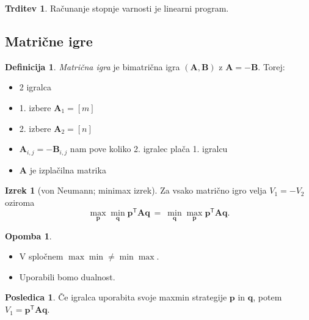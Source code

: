 \documentclass[11pt]{article}
\newcommand{\oklepaj}[1]{\left(#1\right)}
\newcommand{\T}{\textsf{T}}
\newcommand{\p}{\mathbf{p}}
\newcommand{\q}{\mathbf{q}}
\renewcommand{\AA}{\mathbf{A}}
\newcommand{\BB}{\mathbf{B}}
\newcommand{\1}{\mathbbm{1}}
\theoremstyle{definition}
\newtheorem{definicija}{Definicija}[section]
\theoremstyle{definition}
\newtheorem{trditev}{Trditev}[section]
\theoremstyle{definition}
\newtheorem{izrek}{Izrek}[section]
\theoremstyle{definition}
\newtheorem*{posledica}{Posledica}
\newtheorem*{opomba}{Opomba}
\begin{document}
\begin{trditev}

Računanje stopnje varnosti je linearni program.

\end{trditev}
\vspace{0.5cm}


\subsection{Matrične igre}
\vspace{0.5cm}

\begin{definicija}

\textit{Matrična igra} je bimatrična igra $\oklepaj{\AA,\BB}$ z $\AA=-\BB$. Torej:
\begin{itemize}
	\item 2 igralca
	\item 1. izbere $\AA_1 = [m]$
	\item 2. izbere $\AA_2 = [n]$
	\item $\AA_{i,j}=-\BB_{i,j}$ nam pove koliko 2. igralec plača 1. igralcu
	\item $\AA$ je izplačilna matrika
\end{itemize}

\end{definicija}
\vspace{0.5cm}

\begin{izrek}[von Neumann; minimax izrek]

Za vsako matrično igro velja $V_1 = -V_2$ oziroma
$$\max_\p \min_\q \p^\T\AA\q ~=~ \min_\q \max_\p \p^\T\AA\q.$$

\end{izrek}
\vspace{0.5cm}

\begin{opomba}
~
\begin{itemize}
	\item V spločnem $\max\min \neq \min\max$.
	\item Uporabili bomo dualnost.
\end{itemize}

\end{opomba}
\vspace{0.5cm}

\begin{posledica}

Če igralca uporabita svoje maxmin strategije $\p$ in $\q$, potem $V_1 = \p^\T\AA\q$.

\end{posledica}
\vspace{0.5cm}
\end{document}
